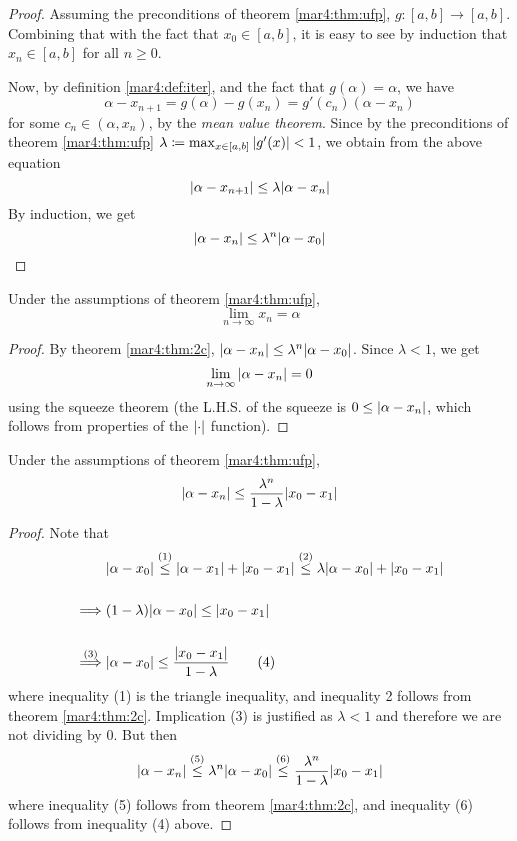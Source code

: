 \begin{proof}
	Assuming the preconditions of theorem \ref{mar4:thm:ufp}, $g \colon [a, b] \to [a, b]$. Combining that with the fact that $x_0 \in [a, b]$, it is easy to see by induction that $x_n \in [a, b]$ for all $n \geq 0$.

	Now, by definition \ref{mar4:def:iter}, and the fact that $g(\alpha) = \alpha$, we have
	\[
		\alpha - x_{n+1} = g(\alpha) - g(x_n) = g'(c_n)(\alpha - x_n)
	\]
	for some $c_n \in (\alpha, x_n)$, by the \emph{mean value theorem}. Since by the preconditions of theorem \ref{mar4:thm:ufp} $\lambda \coloneqq \max_{x \in [a, b]} \abs{g'(x)} < 1$, we obtain from the above equation
	\[
		\abs{\alpha - x_{n+1}} \leq \lambda\abs{\alpha - x_n}
	\]
	By induction, we get
	\[
		\abs{\alpha - x_n} \leq \lambda^n\abs{\alpha - x_0}
	\]
	\hfill
\end{proof}
\begin{corr}
	Under the assumptions of theorem \ref{mar4:thm:ufp},
	\[
		\lim_{n\to\infty} x_n = \alpha
	\]
\end{corr}
\begin{proof}
	By theorem \ref{mar4:thm:2c}, $\abs{\alpha - x_n} \leq \lambda^n\abs{\alpha - x_0}$. Since $\lambda < 1$, we get
	\[
		\lim_{n\to\infty}\abs{\alpha - x_n} = 0
	\]
	using the squeeze theorem (the L.H.S. of the squeeze is $0 \leq \abs{\alpha - x_n}$, which follows from properties of the $\abs{\cdot}$ function).
	\hfill
\end{proof}
\begin{corr}
	Under the assumptions of theorem \ref{mar4:thm:ufp},
	\[
		\abs{\alpha - x_n} \leq \frac{\lambda^n}{1 - \lambda}\abs{x_0 - x_1}
	\]
\end{corr}
\begin{proof}
	Note that
	\begin{align*}
		                  & \abs{\alpha - x_0}
		\lao[\leq]{1} \abs{\alpha - x_1} + \abs{x_0 - x_1}
		\lao[\leq]{2} \lambda\abs{\alpha - x_0} + \abs{x_0 - x_1} \\\\
		\implies          &
		(1-\lambda)\abs{\alpha - x_0}
		\leq
		\abs{x_0 - x_1}                                           \\\\
		\lao[\implies]{3} &
		\abs{\alpha - x_0}
		\leq
		\frac{\abs{x_0 - x_1}}{1-\lambda} \tag{4}
	\end{align*}
	where inequality (1) is the triangle inequality, and inequality 2 follows from theorem \ref{mar4:thm:2c}. Implication (3) is justified as $\lambda < 1$ and therefore we are not dividing by 0. But then
	\[
		\abs{\alpha - x_n}
		\lao[\leq]{5}
		\lambda^n\abs{\alpha - x_0}
		\lao[\leq]{6}
		\frac{\lambda^n}{1-\lambda}\abs{x_0 - x_1}
	\]
	where inequality (5) follows from theorem \ref{mar4:thm:2c}, and inequality (6) follows from inequality (4) above.

	\hfill
\end{proof}
